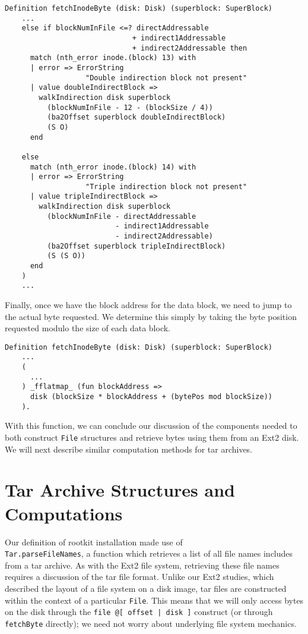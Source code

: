 \documentclass[nocopyrightspace,preprint]{sigplanconf}
\begin{document}
\begin{lstlisting}
Definition fetchInodeByte (disk: Disk) (superblock: SuperBlock)
    ...
    else if blockNumInFile <=? directAddressable
                              + indirect1Addressable
                              + indirect2Addressable then
      match (nth_error inode.(block) 13) with
      | error => ErrorString 
                   "Double indirection block not present"
      | value doubleIndirectBlock =>
        walkIndirection disk superblock
          (blockNumInFile - 12 - (blockSize / 4)) 
          (ba2Offset superblock doubleIndirectBlock) 
          (S O)
      end

    else 
      match (nth_error inode.(block) 14) with
      | error => ErrorString 
                   "Triple indirection block not present"
      | value tripleIndirectBlock =>
        walkIndirection disk superblock 
          (blockNumInFile - directAddressable
                          - indirect1Addressable
                          - indirect2Addressable)
          (ba2Offset superblock tripleIndirectBlock)
          (S (S O))
      end
    ) 
    ...
\end{lstlisting}

Finally, once we have the block address for the data block, we need to jump to
the actual byte requested. We determine this simply by taking the byte
position requested modulo the size of each data block.

\begin{lstlisting}
Definition fetchInodeByte (disk: Disk) (superblock: SuperBlock)
    ...
    (
      ...
    ) _fflatmap_ (fun blockAddress =>
      disk (blockSize * blockAddress + (bytePos mod blockSize))
    ).
\end{lstlisting}

With this function, we can conclude our discussion of the components needed
to both construct {\tt File} structures and retrieve bytes using them from an
Ext2 disk. We will next describe similar computation methods for tar archives.

\section{Tar Archive Structures and Computations}
\label{sec:tar}

Our definition of rootkit installation made use of \\{\tt Tar.parseFileNames},
a function which retrieves a list of all file names includes from a tar
archive. As with the Ext2 file system, retrieving these file names requires a
discussion of the tar file format. Unlike our Ext2 studies, which described
the layout of a file system on a disk image, tar files are constructed within
the context of a particular {\tt File}. This means that we will only access
bytes on the disk through the {\tt file @[ offset | disk ]} construct (or
through {\tt fetchByte} directly); we need not worry about underlying file
system mechanics.
\end{document}
